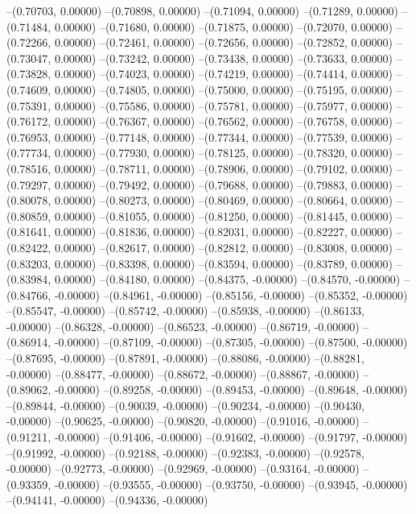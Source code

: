--(0.70703, 0.00000)
--(0.70898, 0.00000)
--(0.71094, 0.00000)
--(0.71289, 0.00000)
--(0.71484, 0.00000)
--(0.71680, 0.00000)
--(0.71875, 0.00000)
--(0.72070, 0.00000)
--(0.72266, 0.00000)
--(0.72461, 0.00000)
--(0.72656, 0.00000)
--(0.72852, 0.00000)
--(0.73047, 0.00000)
--(0.73242, 0.00000)
--(0.73438, 0.00000)
--(0.73633, 0.00000)
--(0.73828, 0.00000)
--(0.74023, 0.00000)
--(0.74219, 0.00000)
--(0.74414, 0.00000)
--(0.74609, 0.00000)
--(0.74805, 0.00000)
--(0.75000, 0.00000)
--(0.75195, 0.00000)
--(0.75391, 0.00000)
--(0.75586, 0.00000)
--(0.75781, 0.00000)
--(0.75977, 0.00000)
--(0.76172, 0.00000)
--(0.76367, 0.00000)
--(0.76562, 0.00000)
--(0.76758, 0.00000)
--(0.76953, 0.00000)
--(0.77148, 0.00000)
--(0.77344, 0.00000)
--(0.77539, 0.00000)
--(0.77734, 0.00000)
--(0.77930, 0.00000)
--(0.78125, 0.00000)
--(0.78320, 0.00000)
--(0.78516, 0.00000)
--(0.78711, 0.00000)
--(0.78906, 0.00000)
--(0.79102, 0.00000)
--(0.79297, 0.00000)
--(0.79492, 0.00000)
--(0.79688, 0.00000)
--(0.79883, 0.00000)
--(0.80078, 0.00000)
--(0.80273, 0.00000)
--(0.80469, 0.00000)
--(0.80664, 0.00000)
--(0.80859, 0.00000)
--(0.81055, 0.00000)
--(0.81250, 0.00000)
--(0.81445, 0.00000)
--(0.81641, 0.00000)
--(0.81836, 0.00000)
--(0.82031, 0.00000)
--(0.82227, 0.00000)
--(0.82422, 0.00000)
--(0.82617, 0.00000)
--(0.82812, 0.00000)
--(0.83008, 0.00000)
--(0.83203, 0.00000)
--(0.83398, 0.00000)
--(0.83594, 0.00000)
--(0.83789, 0.00000)
--(0.83984, 0.00000)
--(0.84180, 0.00000)
--(0.84375, -0.00000)
--(0.84570, -0.00000)
--(0.84766, -0.00000)
--(0.84961, -0.00000)
--(0.85156, -0.00000)
--(0.85352, -0.00000)
--(0.85547, -0.00000)
--(0.85742, -0.00000)
--(0.85938, -0.00000)
--(0.86133, -0.00000)
--(0.86328, -0.00000)
--(0.86523, -0.00000)
--(0.86719, -0.00000)
--(0.86914, -0.00000)
--(0.87109, -0.00000)
--(0.87305, -0.00000)
--(0.87500, -0.00000)
--(0.87695, -0.00000)
--(0.87891, -0.00000)
--(0.88086, -0.00000)
--(0.88281, -0.00000)
--(0.88477, -0.00000)
--(0.88672, -0.00000)
--(0.88867, -0.00000)
--(0.89062, -0.00000)
--(0.89258, -0.00000)
--(0.89453, -0.00000)
--(0.89648, -0.00000)
--(0.89844, -0.00000)
--(0.90039, -0.00000)
--(0.90234, -0.00000)
--(0.90430, -0.00000)
--(0.90625, -0.00000)
--(0.90820, -0.00000)
--(0.91016, -0.00000)
--(0.91211, -0.00000)
--(0.91406, -0.00000)
--(0.91602, -0.00000)
--(0.91797, -0.00000)
--(0.91992, -0.00000)
--(0.92188, -0.00000)
--(0.92383, -0.00000)
--(0.92578, -0.00000)
--(0.92773, -0.00000)
--(0.92969, -0.00000)
--(0.93164, -0.00000)
--(0.93359, -0.00000)
--(0.93555, -0.00000)
--(0.93750, -0.00000)
--(0.93945, -0.00000)
--(0.94141, -0.00000)
--(0.94336, -0.00000)
